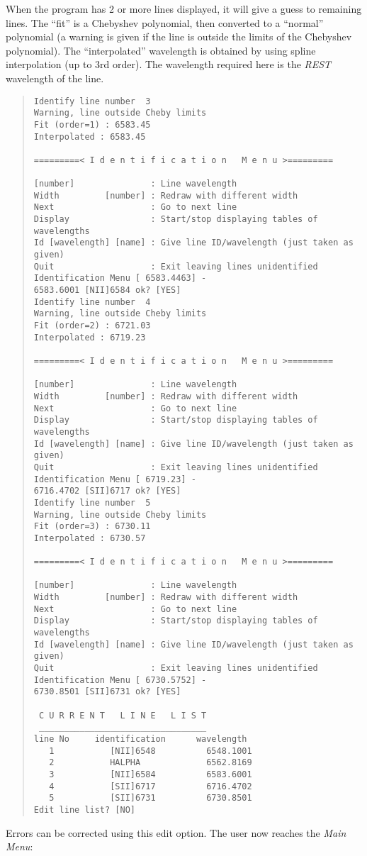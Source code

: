 When the program has 2 or more lines displayed, it will give a guess to
remaining lines.
The ``fit'' is a Chebyshev polynomial, then converted to a ``normal''
polynomial (a warning is given if the line is outside the limits of the
Chebyshev polynomial).
The ``interpolated'' wavelength is obtained by using spline
interpolation (up to 3rd order).
The wavelength required here is the {\em REST} wavelength of the line.
\begin{quote}\begin{verbatim}
Identify line number  3
Warning, line outside Cheby limits
Fit (order=1) : 6583.45
Interpolated : 6583.45
 
=========< I d e n t i f i c a t i o n   M e n u >=========
 
[number]               : Line wavelength
Width         [number] : Redraw with different width
Next                   : Go to next line
Display                : Start/stop displaying tables of wavelengths
Id [wavelength] [name] : Give line ID/wavelength (just taken as given)
Quit                   : Exit leaving lines unidentified
Identification Menu [ 6583.4463] -
6583.6001 [NII]6584 ok? [YES]
Identify line number  4
Warning, line outside Cheby limits
Fit (order=2) : 6721.03
Interpolated : 6719.23
 
=========< I d e n t i f i c a t i o n   M e n u >=========
 
[number]               : Line wavelength
Width         [number] : Redraw with different width
Next                   : Go to next line
Display                : Start/stop displaying tables of wavelengths
Id [wavelength] [name] : Give line ID/wavelength (just taken as given)
Quit                   : Exit leaving lines unidentified
Identification Menu [ 6719.23] -
6716.4702 [SII]6717 ok? [YES]
Identify line number  5
Warning, line outside Cheby limits
Fit (order=3) : 6730.11
Interpolated : 6730.57
 
=========< I d e n t i f i c a t i o n   M e n u >=========
 
[number]               : Line wavelength
Width         [number] : Redraw with different width
Next                   : Go to next line
Display                : Start/stop displaying tables of wavelengths
Id [wavelength] [name] : Give line ID/wavelength (just taken as given)
Quit                   : Exit leaving lines unidentified
Identification Menu [ 6730.5752] -
6730.8501 [SII]6731 ok? [YES]
 
 C U R R E N T   L I N E   L I S T
 _________________________________
line No     identification      wavelength
   1           [NII]6548          6548.1001
   2           HALPHA             6562.8169
   3           [NII]6584          6583.6001
   4           [SII]6717          6716.4702
   5           [SII]6731          6730.8501
Edit line list? [NO]
\end{verbatim}\end{quote}
Errors can be corrected using this edit option.
The user now reaches the {\it Main Menu}:

